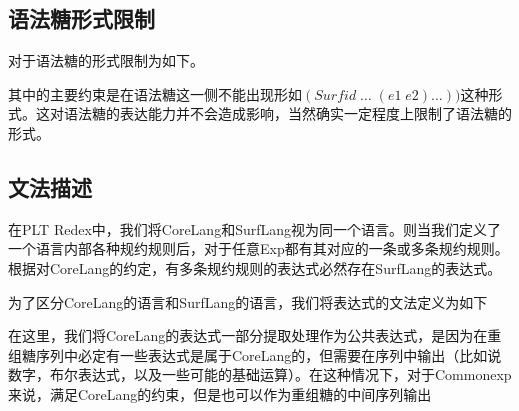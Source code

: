 \subsection{语法糖形式限制}

对于语法糖的形式限制为如下。


其中的主要约束是在语法糖这一侧不能出现形如$(Surfid\;\ldots\;(e1\;e2)\ldots))$这种形式。这对语法糖的表达能力并不会造成影响，当然确实一定程度上限制了语法糖的形式。

\subsection{文法描述}
在PLT Redex中，我们将CoreLang和SurfLang视为同一个语言。则当我们定义了一个语言内部各种规约规则后，对于任意Exp都有其对应的一条或多条规约规则。根据对CoreLang的约定，有多条规约规则的表达式必然存在SurfLang的表达式。

为了区分CoreLang的语言和SurfLang的语言，我们将表达式的文法定义为如下


在这里，我们将CoreLang的表达式一部分提取处理作为公共表达式，是因为在重组糖序列中必定有一些表达式是属于CoreLang的，但需要在序列中输出（比如说数字，布尔表达式，以及一些可能的基础运算）。在这种情况下，对于Commonexp来说，满足CoreLang的约束，但是也可以作为重组糖的中间序列输出

